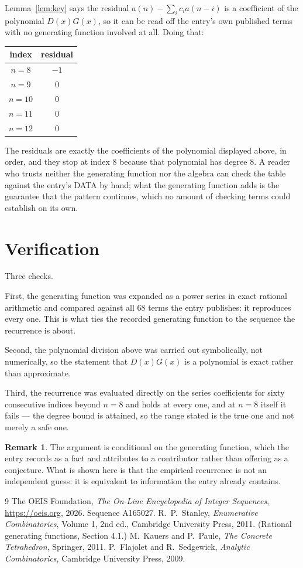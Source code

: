 \documentclass[11pt,a4paper]{article}
\theoremstyle{plain}
\theoremstyle{definition}
\newtheorem{remark}[theorem]{Remark}
\begin{document}
Lemma~\ref{lem:key} says the residual $a(n)-\sum_ic_ia(n-i)$ is a coefficient of the
polynomial $D(x)G(x)$, so it can be read off the entry's own published terms with no
generating function involved at all. Doing that:
\begin{center}
\begin{tabular}{cc}
index & residual \\ \hline
$n=8$ & $-1$ \\
$n=9$ & $0$ \\
$n=10$ & $0$ \\
$n=11$ & $0$ \\
$n=12$ & $0$
\end{tabular}
\end{center}
The residuals are exactly the coefficients of the polynomial displayed above, in order, and
they stop at index $8$ because that polynomial has degree $8$. A reader who trusts
neither the generating function nor the algebra can check the table against the entry's DATA
by hand; what the generating function adds is the guarantee that the pattern continues, which
no amount of checking terms could establish on its own.

\section{Verification}

Three checks.

First, the generating function was expanded as a power series in exact rational arithmetic and
compared against all $68$ terms the entry publishes: it reproduces every one. This is
what ties the recorded generating function to the sequence the recurrence is about.

Second, the polynomial division above was carried out symbolically, not numerically, so the
statement that $D(x)G(x)$ is a polynomial is exact rather than approximate.

Third, the recurrence was evaluated directly on the series coefficients for sixty consecutive
indices beyond $n=8$ and holds at every one, and at $n=8$ itself it fails --- the
degree bound is attained, so the range stated is the true one and not merely a safe one.

\begin{remark}
The argument is conditional on the generating function, which the entry records as a fact and
attributes to a contributor rather than offering as a conjecture. What is shown here is that
the empirical recurrence is not an independent guess: it is equivalent to information the
entry already contains.
\end{remark}

\begin{thebibliography}{9}
 The OEIS Foundation, \emph{The On-Line Encyclopedia of Integer
Sequences}, \url{https://oeis.org}, 2026. Sequence A165027.
 R.~P.~Stanley, \emph{Enumerative Combinatorics}, Volume 1, 2nd ed.,
Cambridge University Press, 2011. (Rational generating functions, Section 4.1.)
 M.~Kauers and P.~Paule, \emph{The Concrete Tetrahedron}, Springer, 2011.
 P.~Flajolet and R.~Sedgewick, \emph{Analytic Combinatorics}, Cambridge
University Press, 2009.
\end{thebibliography}
\end{document}
